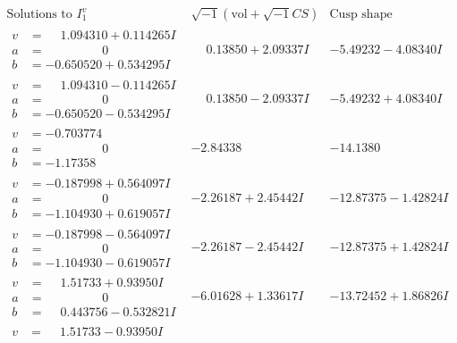 \documentclass[1p]{elsarticle_modified}
\theoremstyle{definition}
\newcommand{\I}{\sqrt{-1}}
\begin{document}
$$\begin{array}{c|c|c}  
\text{Solutions to }I^v_{1}& \I (\text{vol} + \sqrt{-1}CS) & \text{Cusp shape}\\
 \hline 
\begin{aligned}
v &= \phantom{-}1.094310 + 0.114265 I \\
a &= \phantom{-0.000000 } 0 \\
b &= -0.650520 + 0.534295 I\end{aligned}
 & \phantom{-}0.13850 + 2.09337 I & -5.49232 - 4.08340 I \\ \hline\begin{aligned}
v &= \phantom{-}1.094310 - 0.114265 I \\
a &= \phantom{-0.000000 } 0 \\
b &= -0.650520 - 0.534295 I\end{aligned}
 & \phantom{-}0.13850 - 2.09337 I & -5.49232 + 4.08340 I \\ \hline\begin{aligned}
v &= -0.703774\phantom{ +0.000000I} \\
a &= \phantom{-0.000000 } 0 \\
b &= -1.17358\phantom{ +0.000000I}\end{aligned}
 & -2.84338\phantom{ +0.000000I} & -14.1380\phantom{ +0.000000I} \\ \hline\begin{aligned}
v &= -0.187998 + 0.564097 I \\
a &= \phantom{-0.000000 } 0 \\
b &= -1.104930 + 0.619057 I\end{aligned}
 & -2.26187 + 2.45442 I & -12.87375 - 1.42824 I \\ \hline\begin{aligned}
v &= -0.187998 - 0.564097 I \\
a &= \phantom{-0.000000 } 0 \\
b &= -1.104930 - 0.619057 I\end{aligned}
 & -2.26187 - 2.45442 I & -12.87375 + 1.42824 I \\ \hline\begin{aligned}
v &= \phantom{-}1.51733 + 0.93950 I \\
a &= \phantom{-0.000000 } 0 \\
b &= \phantom{-}0.443756 - 0.532821 I\end{aligned}
 & -6.01628 + 1.33617 I & -13.72452 + 1.86826 I \\ \hline\begin{aligned}
v &= \phantom{-}1.51733 - 0.93950 I \\

\end{aligned}
\end{array}$$
\end{document}
